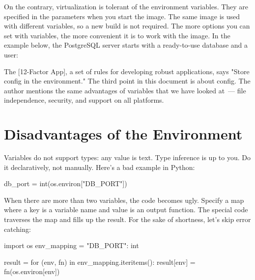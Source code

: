 
On the contrary, virtualization is tolerant of the environment variables. They are specified in the parameters when you start the image. The same image is used with different variables, so a new build is not required. The more options you can set with variables, the more convenient it is to work with the image. In the example below, the PostgreSQL server starts with a ready-to-use database and a user:

\begin{english}
\end{english}


The [12-Factor App], a set of rules for developing robust applications, says "Store config in the environment." The third point in this document is about config. The author mentions the same advantages of variables that we have looked at~--- file independence, security, and support on all platforms.

\section{Disadvantages of the Environment}

\index{declarativity}

Variables do not support types: any value is text. Type inference is up to you. Do it declaratively, not manually. Here's a bad example in Python:


\begin{english}
  \begin{python}
db_port = int(os.environ["DB_PORT"])
  \end{python}
\end{english}

When there are more than two variables, the code becomes ugly. Specify a map where a key is a variable name and value is an output function. The special code traverses the map and fills up the result. For the sake of shortness, let's skip error catching:

\begin{english}
  \begin{python}
import os
env_mapping = {"DB_PORT": int}

result = {}
for (env, fn) in env_mapping.iteritems():
    result[env] = fn(os.environ[env])
  \end{python}
\end{english}

